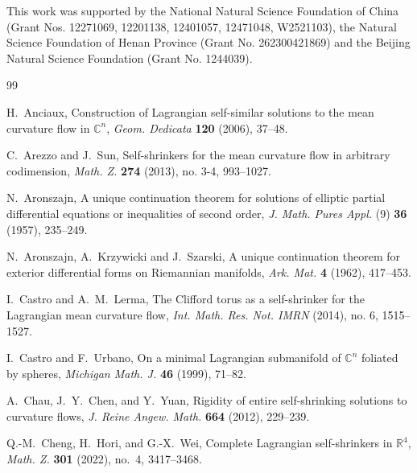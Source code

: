 \documentclass[11pt,a4paper]{article}
\numberwithin{equation}{section}
\newcommand{\C}{\mathbb C}
\begin{document}
This work was supported by the National Natural Science Foundation of China (Grant Nos. 12271069, 12201138, 12401057, 12471048, W2521103), the Natural Science Foundation of Henan Province (Grant No. 262300421869) and the Beijing Natural Science Foundation (Grant No. 1244039).





\begin{thebibliography}{99}

H.~Anciaux,
Construction of Lagrangian self-similar solutions to the mean curvature flow in $\C^n$,
\emph{Geom. Dedicata} \textbf{120} (2006), 37--48.

C.~Arezzo and J.~Sun, 
 Self-shrinkers for the mean curvature flow in arbitrary codimension,
 \emph{Math. Z.} \textbf{274} (2013), no. 3-4, 993--1027.
 
N.~Aronszajn,
A unique continuation theorem for solutions of elliptic partial differential equations or inequalities of second order,
\emph{J. Math. Pures Appl.} (9) \textbf{36} (1957), 235--249.

N.~Aronszajn, A.~Krzywicki and J.~Szarski,
A unique continuation theorem for exterior differential forms on Riemannian manifolds,
\emph{Ark. Mat.} \textbf{4} (1962), 417--453.

I.~Castro and A.~M.~Lerma,
 The Clifford torus as a self-shrinker for the Lagrangian mean curvature flow,
\emph{Int. Math. Res. Not. IMRN}  (2014), no. 6, 1515--1527.

I.~Castro and F.~Urbano,
On a minimal Lagrangian submanifold of $\C^n$ foliated by spheres,
\emph{Michigan Math. J.} \textbf{46} (1999), 71--82.

A.~Chau, J.~Y.~Chen, and Y.~Yuan, 
Rigidity of entire self-shrinking solutions to curvature flows,
\emph{J. Reine Angew. Math.} \textbf{664} (2012), 229--239.

Q.-M.~Cheng, H.~Hori, and G.-X.~Wei,
Complete Lagrangian self-shrinkers in  $\mathbb{R}^4$,
\emph{Math. Z.} \textbf{301} (2022), no.~4, 3417--3468.


\end{thebibliography}
\end{document}
